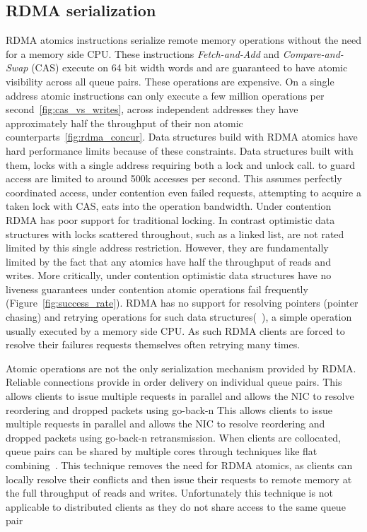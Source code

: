 \subsection{RDMA serialization} RDMA atomics instructions
serialize remote memory operations without the need for a
memory side CPU. These instructions \textit{Fetch-and-Add}
and \textit{Compare-and-Swap} (CAS) execute on 64 bit width
words and are guaranteed to have atomic visibility across
all queue pairs. These operations are expensive. On a single
address atomic instructions can only execute a few million
operations per second~\ref{fig:cas_vs_writes}, across
independent addresses they have approximately half the
throughput of their non atomic
counterparts~\ref{fig:rdma_concur}. 
Data structures build with RDMA atomics have hard
performance limits because of these constraints.  Data
structures built with them, locks with a single address
requiring both a lock and unlock call.  to guard access are
limited to around 500k accesses per second. This assumes
perfectly coordinated access, under contention even failed
requests, attempting to acquire a taken lock with CAS, eats
into the operation bandwidth.  Under contention RDMA has
poor support for traditional locking. In contrast optimistic
data structures with locks scattered throughout, such as a
linked list, are not rated limited by this single address
restriction.  However, they are fundamentally limited by the
fact that any atomics have half the throughput of reads and
writes. More critically, under contention optimistic data
structures have no liveness guarantees under contention
atomic operations fail frequently (Figure~\ref{fig:success_rate}).
RDMA has no support for resolving pointers (pointer chasing)
and retrying operations for such data
structures(~\cite{rma}), a simple operation usually executed
by a memory side CPU. As such RDMA clients are forced to
resolve their failures requests themselves often retrying
many times.

Atomic operations are not the only serialization mechanism
provided by RDMA. Reliable connections provide in order
delivery on individual queue pairs. This allows clients to
issue multiple requests in parallel and allows the NIC to
resolve reordering and dropped packets using go-back-n This
allows clients to issue multiple requests in parallel and
allows the NIC to resolve reordering and dropped packets
using go-back-n retransmission. When clients are collocated,
queue pairs can be shared by multiple cores through
techniques like flat combining~\cite{flock,sherman}. This
technique removes the need for RDMA atomics, as clients can
locally resolve their conflicts and then issue their
requests to remote memory at the full throughput of reads
and writes. Unfortunately this technique is not applicable
to distributed clients as they do not share access to the
same queue pair

